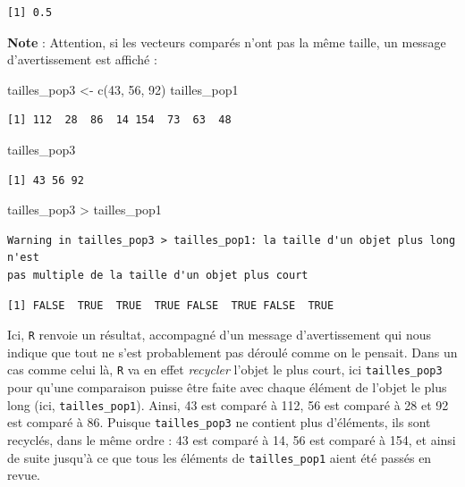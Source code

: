 \documentclass[
  a4paper,
  DIV=11,
  numbers=noendperiod,
  oneside]{scrreprt}
\newenvironment{Shaded}{}{}
\newcommand{\DecValTok}[1]{\textcolor[rgb]{0.00,0.36,0.77}{#1}}
\newcommand{\FunctionTok}[1]{\textcolor[rgb]{0.44,0.26,0.76}{#1}}
\newcommand{\NormalTok}[1]{\textcolor[rgb]{0.14,0.16,0.18}{#1}}
\newcommand{\OtherTok}[1]{\textcolor[rgb]{0.44,0.26,0.76}{#1}}
\newcommand{\SpecialCharTok}[1]{\textcolor[rgb]{0.00,0.36,0.77}{#1}}
\begin{document}
\begin{verbatim}
[1] 0.5
\end{verbatim}

\textbf{Note} : Attention, si les vecteurs comparés n'ont pas la même
taille, un message d'avertissement est affiché :

\begin{Shaded}
\begin{Highlighting}[]
\NormalTok{tailles\_pop3 }\OtherTok{\textless{}{-}} \FunctionTok{c}\NormalTok{(}\DecValTok{43}\NormalTok{, }\DecValTok{56}\NormalTok{, }\DecValTok{92}\NormalTok{)}
\NormalTok{tailles\_pop1}
\end{Highlighting}
\end{Shaded}

\begin{verbatim}
[1] 112  28  86  14 154  73  63  48
\end{verbatim}

\begin{Shaded}
\begin{Highlighting}[]
\NormalTok{tailles\_pop3}
\end{Highlighting}
\end{Shaded}

\begin{verbatim}
[1] 43 56 92
\end{verbatim}

\begin{Shaded}
\begin{Highlighting}[]
\NormalTok{tailles\_pop3 }\SpecialCharTok{\textgreater{}}\NormalTok{ tailles\_pop1}
\end{Highlighting}
\end{Shaded}

\begin{verbatim}
Warning in tailles_pop3 > tailles_pop1: la taille d'un objet plus long n'est
pas multiple de la taille d'un objet plus court
\end{verbatim}

\begin{verbatim}
[1] FALSE  TRUE  TRUE  TRUE FALSE  TRUE FALSE  TRUE
\end{verbatim}

Ici, \texttt{R} renvoie un résultat, accompagné d'un message
d'avertissement qui nous indique que tout ne s'est probablement pas
déroulé comme on le pensait. Dans un cas comme celui là, \texttt{R} va
en effet \emph{recycler} l'objet le plus court, ici
\texttt{tailles\_pop3} pour qu'une comparaison puisse être faite avec
chaque élément de l'objet le plus long (ici, \texttt{tailles\_pop1}).
Ainsi, 43 est comparé à 112, 56 est comparé à 28 et 92 est comparé à 86.
Puisque \texttt{tailles\_pop3} ne contient plus d'éléments, ils sont
recyclés, dans le même ordre : 43 est comparé à 14, 56 est comparé à
154, et ainsi de suite jusqu'à ce que tous les éléments de
\texttt{tailles\_pop1} aient été passés en revue.
\end{document}
